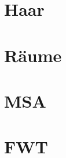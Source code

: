 %
%
%

\begin{frame}
\titlepage
\end{frame}

\section{Haar}


\section{Räume}


\section{MSA}


\section{FWT}


